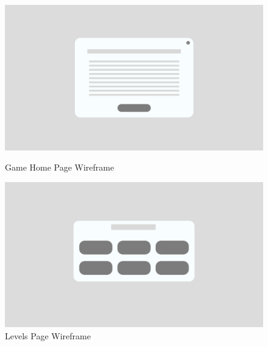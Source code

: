 \begin{figure}[H]
    \centering
    \begin{minipage}{0.45\textwidth}
      \centering
      \includegraphics[width=\linewidth]{Chapters/figma/home-wireframe.png}
      \caption{Game Home Page Wireframe}
      \label{fig:home-wireframe}
    \end{minipage}
    \hfill
    \begin{minipage}{0.45\textwidth}
      \centering
      \includegraphics[width=\linewidth]{Chapters/figma/levels-wireframe.png}
      \caption{Levels Page Wireframe}
      \label{fig:levels-wireframe}
    \end{minipage}
\end{figure}



